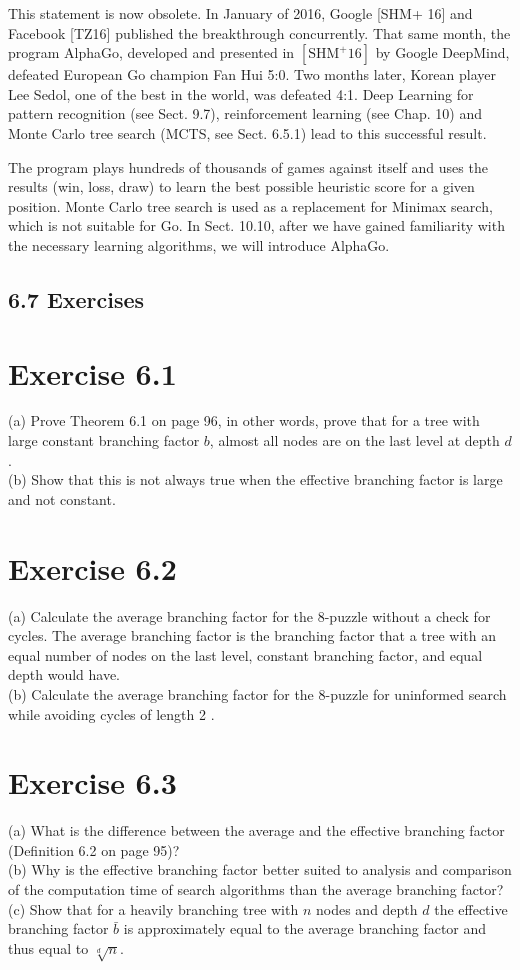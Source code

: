 \documentclass[10pt]{article}
\begin{document}
This statement is now obsolete. In January of 2016, Google [SHM+ 16] and Facebook [TZ16] published the breakthrough concurrently. That same month, the program AlphaGo, developed and presented in $\left[\mathrm{SHM}^{+} 16\right]$ by Google DeepMind, defeated European Go champion Fan Hui 5:0. Two months later, Korean player Lee Sedol, one of the best in the world, was defeated 4:1. Deep Learning for pattern recognition (see Sect. 9.7), reinforcement learning (see Chap. 10) and Monte Carlo tree search (MCTS, see Sect. 6.5.1) lead to this successful result.

The program plays hundreds of thousands of games against itself and uses the results (win, loss, draw) to learn the best possible heuristic score for a given position. Monte Carlo tree search is used as a replacement for Minimax search, which is not suitable for Go. In Sect. 10.10, after we have gained familiarity with the necessary learning algorithms, we will introduce AlphaGo.

\subsection*{6.7 Exercises}
\section*{Exercise 6.1}
(a) Prove Theorem 6.1 on page 96, in other words, prove that for a tree with large constant branching factor $b$, almost all nodes are on the last level at depth $d$.\\
(b) Show that this is not always true when the effective branching factor is large and not constant.

\section*{Exercise 6.2}
(a) Calculate the average branching factor for the 8-puzzle without a check for cycles. The average branching factor is the branching factor that a tree with an equal number of nodes on the last level, constant branching factor, and equal depth would have.\\
(b) Calculate the average branching factor for the 8-puzzle for uninformed search while avoiding cycles of length 2 .

\section*{Exercise 6.3}
(a) What is the difference between the average and the effective branching factor (Definition 6.2 on page 95)?\\
(b) Why is the effective branching factor better suited to analysis and comparison of the computation time of search algorithms than the average branching factor?\\
(c) Show that for a heavily branching tree with $n$ nodes and depth $d$ the effective branching factor $\bar{b}$ is approximately equal to the average branching factor and thus equal to $\sqrt[d]{n}$.
\end{document}
